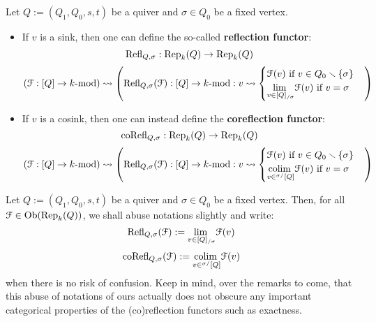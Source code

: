             \begin{definition} \label{def: (co)reflection_functors}
                Let $Q := (Q_1, Q_0, s, t)$ be a quiver and $\sigma \in Q_0$ be a fixed vertex. 
                    \begin{itemize}
                        \item If $v$ is a sink, then one can define the so-called \textbf{reflection functor}:
                            $$\mathrm{Refl}_{Q, \sigma}: \mathrm{Rep}_k(Q) \to \mathrm{Rep}_k(Q)$$
                            $$(\mathcal{F}: [Q] \to k\text{-}\mathrm{mod}) \leadsto \left( \mathrm{Refl}_{Q, \sigma}(\mathcal{F}): [Q] \to k\text{-}\mathrm{mod}: v \leadsto \begin{cases} \text{$\mathcal{F}(v)$ if $v \in Q_0 \smallsetminus \{\sigma\}$} \\ \text{$\underset{v \in [Q]_{/\sigma}}{\operatorname{lim} \:} \mathcal{F}(v)$ if $v = \sigma$} \end{cases} \right)$$
                        \item If $v$ is a cosink, then one can instead define the \textbf{coreflection functor}:
                            $$\mathrm{co}\mathrm{Refl}_{Q, \sigma}: \mathrm{Rep}_k(Q) \to \mathrm{Rep}_k(Q)$$
                            $$(\mathcal{F}: [Q] \to k\text{-}\mathrm{mod}) \leadsto \left( \mathrm{Refl}_{Q, \sigma}(\mathcal{F}): [Q] \to k\text{-}\mathrm{mod}: v \leadsto \begin{cases} \text{$\mathcal{F}(v)$ if $v \in Q_0 \smallsetminus \{\sigma\}$} \\ \text{$\underset{v \in {}^{\sigma/}[Q]}{\operatorname{colim} \:} \mathcal{F}(v)$ if $v = \sigma$} \end{cases} \right)$$
                    \end{itemize}
            \end{definition}
            \begin{convention}
                Let $Q := (Q_1, Q_0, s, t)$ be a quiver and $\sigma \in Q_0$ be a fixed vertex. Then, for all $\mathcal{F} \in \mathrm{Ob}(\mathrm{Rep}_k(Q))$, we shall abuse notations slightly and write:
                    $$\mathrm{Refl}_{Q, \sigma}(\mathcal{F}) := \underset{v \in [Q]_{/\sigma}}{\operatorname{lim} \:} \mathcal{F}(v)$$
                    $$\mathrm{co}\mathrm{Refl}_{Q, \sigma}(\mathcal{F}) := \underset{v \in {}^{\sigma/}[Q]}{\operatorname{colim} \:} \mathcal{F}(v)$$
                when there is no risk of confusion. Keep in mind, over the remarks to come, that this abuse of notations of ours actually does not obscure any important categorical properties of the (co)reflection functors such as exactness.
            \end{convention}

